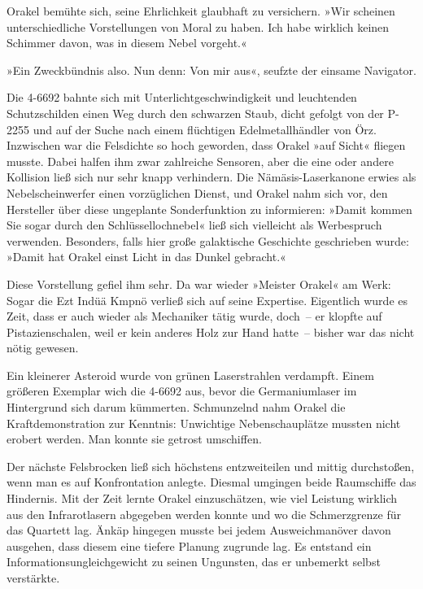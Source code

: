 Orakel bemühte sich, seine Ehrlichkeit glaubhaft zu versichern. »Wir scheinen unterschiedliche Vorstellungen von Moral zu haben. Ich habe wirklich keinen Schimmer davon, was in diesem Nebel vorgeht.«


»Ein Zweckbündnis also. Nun denn: Von mir aus«, seufzte der einsame Navigator.

Die 4-6692 bahnte sich mit Unterlichtgeschwindigkeit und leuchtenden Schutzschilden einen Weg durch den schwarzen Staub, dicht gefolgt von der P-2255 und auf der Suche nach einem flüchtigen Edelmetallhändler von Örz. Inzwischen war die Felsdichte so hoch geworden, dass Orakel »auf Sicht« fliegen musste. Dabei halfen ihm zwar zahlreiche Sensoren, aber die eine oder andere Kollision ließ sich nur sehr knapp verhindern. Die Nämäsis-Laserkanone erwies als Nebelscheinwerfer einen vorzüglichen Dienst, und Orakel nahm sich vor, den Hersteller über diese ungeplante Sonderfunktion zu informieren: »Damit kommen Sie sogar durch den Schlüssellochnebel« ließ sich vielleicht als Werbespruch verwenden. Besonders, falls hier große galaktische Geschichte geschrieben wurde: »Damit hat Orakel einst Licht in das Dunkel gebracht.«

Diese Vorstellung gefiel ihm sehr. Da war wieder »Meister Orakel« am Werk: Sogar die Ezt Indüä Kmpnö verließ sich auf seine Expertise. Eigentlich wurde es Zeit, dass er auch wieder als Mechaniker tätig wurde, doch~– er klopfte auf Pistazienschalen, weil er kein anderes Holz zur Hand hatte~– bisher war das nicht nötig gewesen.

Ein kleinerer Asteroid wurde von grünen Laserstrahlen verdampft. Einem größeren Exemplar wich die 4-6692 aus, bevor die Germaniumlaser im Hintergrund sich darum kümmerten. Schmunzelnd nahm Orakel die Kraftdemonstration zur Kenntnis: Unwichtige Nebenschauplätze mussten nicht erobert werden. Man konnte sie getrost umschiffen.

Der nächste Felsbrocken ließ sich höchstens entzweiteilen und mittig durchstoßen, wenn man es auf Konfrontation anlegte. Diesmal umgingen beide Raumschiffe das Hindernis. Mit der Zeit lernte Orakel einzuschätzen, wie viel Leistung wirklich aus den Infrarotlasern abgegeben werden konnte und wo die Schmerzgrenze für das Quartett lag. Änkäp hingegen musste bei jedem Ausweichmanöver davon ausgehen, dass diesem eine tiefere Planung zugrunde lag. Es entstand ein Informationsungleichgewicht zu seinen Ungunsten, das er unbemerkt selbst verstärkte.

